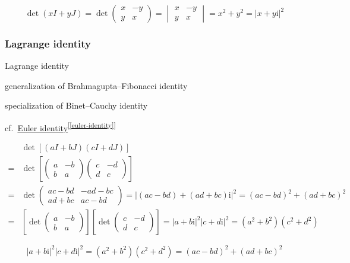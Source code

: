 \documentclass[
]{book}
\theoremstyle{definition}
\theoremstyle{definition}
\theoremstyle{definition}
\theoremstyle{definition}
\theoremstyle{remark}
\begin{document}
\[
\det\left(xI+yJ\right)=\det\begin{pmatrix}x & -y\\
y & x
\end{pmatrix}=\begin{vmatrix}x & -y\\
y & x
\end{vmatrix}=x^{2}+y^{2}=\left|x+y\mathrm{i}\right|^{2}
\]

\hypertarget{lagrange-identity}{%
\subsubsection{Lagrange identity}\label{lagrange-identity}}

Lagrange identity

generalization of Brahmagupta--Fibonacci identity

specialization of Binet--Cauchy identity

cf.~\protect\hyperlink{euler-identity}{Euler identity}\textsuperscript{{[}\ref{euler-identity}{]}}

\[
\begin{aligned}
 & \det\left[\left(aI+bJ\right)\left(cI+dJ\right)\right]\\
= & \det\left[\begin{pmatrix}a & -b\\
b & a
\end{pmatrix}\begin{pmatrix}c & -d\\
d & c
\end{pmatrix}\right]\\
= & \det\begin{pmatrix}ac-bd & -ad-bc\\
ad+bc & ac-bd
\end{pmatrix}=\left|\left(ac-bd\right)+\left(ad+bc\right)\mathrm{i}\right|^{2}=\left(ac-bd\right)^{2}+\left(ad+bc\right)^{2}\\
= & \left[\det\begin{pmatrix}a & -b\\
b & a
\end{pmatrix}\right]\left[\det\begin{pmatrix}c & -d\\
d & c
\end{pmatrix}\right]=\left|a+b\mathrm{i}\right|^{2}\left|c+d\mathrm{i}\right|^{2}=\left(a^{2}+b^{2}\right)\left(c^{2}+d^{2}\right)
\end{aligned}
\]

\[
\left|a+b\mathrm{i}\right|^{2}\left|c+d\mathrm{i}\right|^{2}=\left(a^{2}+b^{2}\right)\left(c^{2}+d^{2}\right)=\left(ac-bd\right)^{2}+\left(ad+bc\right)^{2}
\]
\end{document}
